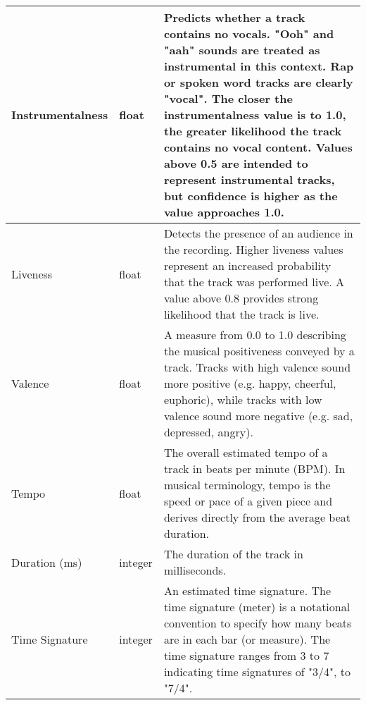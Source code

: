 \begin{table}[ht]
{\begin{tabular}{|>{\raggedright\arraybackslash}p{}|>{\raggedright\arraybackslash}p{}|>{\raggedright\arraybackslash}p{}|}
    \hline
    Instrumentalness & float & Predicts whether a track contains no vocals. "Ooh" and "aah" sounds are treated as instrumental in this context. Rap or spoken word tracks are clearly "vocal". The closer the instrumentalness value is to 1.0, the greater likelihood the track contains no vocal content. Values above 0.5 are intended to represent instrumental tracks, but confidence is higher as the value approaches 1.0. \\
    \hline
    Liveness & float & Detects the presence of an audience in the recording. Higher liveness values represent an increased probability that the track was performed live. A value above 0.8 provides strong likelihood that the track is live. \\
    \hline
    Valence & float & A measure from 0.0 to 1.0 describing the musical positiveness conveyed by a track. Tracks with high valence sound more positive (e.g. happy, cheerful, euphoric), while tracks with low valence sound more negative (e.g. sad, depressed, angry). \\
    \hline
    Tempo & float & The overall estimated tempo of a track in beats per minute (BPM). In musical terminology, tempo is the speed or pace of a given piece and derives directly from the average beat duration. \\
    \hline
    Duration (ms) & integer & The duration of the track in milliseconds. \\
    \hline
    Time Signature & integer & An estimated time signature. The time signature (meter) is a notational convention to specify how many beats are in each bar (or measure). The time signature ranges from 3 to 7 indicating time signatures of "3/4", to "7/4". \\
    \hline
    \end{tabular}
    }
\end{table}